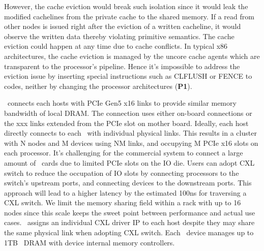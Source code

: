 However, the cache eviction would break such isolation since it would leak the modified cachelines from the private cache to the shared memory. If a read from other nodes is issued right after the eviction of a written cacheline, it would observe the written data thereby violating primitive semantics. The cache eviction could happen at any time due to cache conflicts. In typical x86 architectures, the cache eviction is managed by the uncore cache agents which are transparent to the processor's pipeline. Hence it's impossible to address the eviction issue by inserting special instructions such as CLFLUSH or FENCE to codes, neither by changing the processor architectures (\textbf{P1}). 

\fi



\ifx\stale\undefined
\name~connects each hosts with PCIe Gen5 x16 links to provide similar memory bandwidth of local DRAM. The connection uses either on-board connections or the xxx links extended from the PCIe slot on mother board. Ideally, each host directly connects to each \name~with individual physical links. This results in a cluster with N nodes and M devices using NM links, and occupying M PCIe x16 slots on each processor. It's challenging for the commercial system to connect a large amount of \name~cards due to limited PCIe slots on the IO die. 
Users can adopt CXL switch to reduce the occupation of IO slots by connecting processors to the switch's upstream ports, and connecting devices to the downstream ports. This approach will lead to a higher latency by the estimated 100ns for traversing a CXL switch. 
We limit the memory sharing field within a rack with up to 16 nodes since this scale keeps the sweet point between performance and actual use cases. 
\name~assigns an individual CXL driver IP to each host despite they may share the same physical link when adopting CXL switch. Each \name~device manages up to 1TB~\cite{anns, cxl_samsung} DRAM with device internal memory controllers. 
\fi


